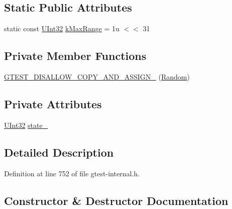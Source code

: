\subsection*{Static Public Attributes}
\begin{DoxyCompactItemize}
\item 
static const \hyperlink{namespacetesting_1_1internal_a40d4fffcd2bf56f18b1c380615aa85e3}{U\+Int32} \hyperlink{classtesting_1_1internal_1_1Random_a36d72dd7063d0b5338f229e75382fdd2}{k\+Max\+Range} = 1u $<$$<$ 31
\end{DoxyCompactItemize}
\subsection*{Private Member Functions}
\begin{DoxyCompactItemize}
\item 
\hyperlink{classtesting_1_1internal_1_1Random_aa2f476d8cfe29f928b90d7339c849734}{G\+T\+E\+S\+T\+\_\+\+D\+I\+S\+A\+L\+L\+O\+W\+\_\+\+C\+O\+P\+Y\+\_\+\+A\+N\+D\+\_\+\+A\+S\+S\+I\+G\+N\+\_\+} (\hyperlink{classtesting_1_1internal_1_1Random}{Random})
\end{DoxyCompactItemize}
\subsection*{Private Attributes}
\begin{DoxyCompactItemize}
\item 
\hyperlink{namespacetesting_1_1internal_a40d4fffcd2bf56f18b1c380615aa85e3}{U\+Int32} \hyperlink{classtesting_1_1internal_1_1Random_ad500e33e3342415afb8a3ab242afa9cc}{state\+\_\+}
\end{DoxyCompactItemize}


\subsection{Detailed Description}


Definition at line 752 of file gtest-\/internal.\+h.



\subsection{Constructor \& Destructor Documentation}
\mbox{\label{classtesting_1_1internal_1_1Random_a6e112be5e7cce00551f6383025f69460}} 
